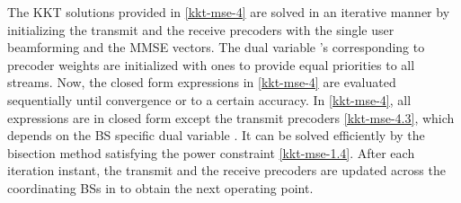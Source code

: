 The \ac{KKT} solutions provided in \eqref{kkt-mse-4} are solved in an iterative manner by initializing the transmit and the receive precoders  with the single user beamforming and the \ac{MMSE} vectors. The dual variable \me{\alpha}'s corresponding to precoder weights are initialized with ones to provide equal priorities to all streams. Now, the closed form expressions in \eqref{kkt-mse-4} are evaluated sequentially until convergence or to a certain accuracy. In \eqref{kkt-mse-4}, all expressions are in closed form except the transmit precoders \eqref{kkt-mse-4.3}, which depends on the \ac{BS} specific dual variable . It can be solved efficiently by the bisection method satisfying the power constraint \eqref{kkt-mse-1.4}. After each iteration instant, the transmit and the receive precoders are updated across the coordinating \acp{BS} in  to obtain the next operating point.

